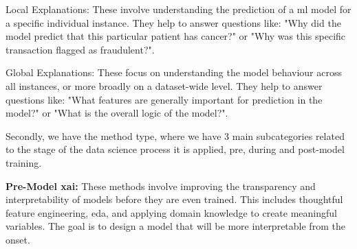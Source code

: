 Local Explanations: These involve understanding the prediction of a \ac{ml} model for a specific individual instance. They help to answer questions like: "Why did the model predict that this particular patient has cancer?" or "Why was this specific transaction flagged as fraudulent?". 

Global Explanations: These focus on understanding the model behaviour across all instances, or more broadly on a dataset-wide level. They help to answer questions like: "What features are generally important for prediction in the model?" or "What is the overall logic of the model?". 

Secondly, we have the method type, where we have 3 main subcategories related to the stage of the data science process it is applied, pre, during and post-model training.

\textbf{Pre-Model \ac{xai}:} These methods involve improving the transparency and interpretability of models before they are even trained. This includes thoughtful feature engineering, \ac{eda}, and applying domain knowledge to create meaningful variables. The goal is to design a model that will be more interpretable from the onset.

